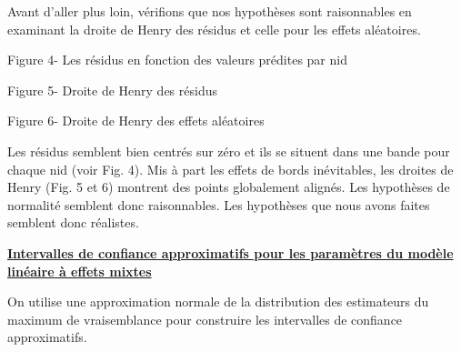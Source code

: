 \documentclass[11pt,fleqn]{book} %
\begin{document}
	\vspace{2em}
	
	Avant d'aller plus loin, vérifions que nos hypothèses sont raisonnables en examinant la droite de Henry des résidus et celle pour les effets aléatoires.
	
	
	\newpage
	
	\begin{center} Figure 4-  Les résidus en fonction des valeurs prédites par nid  \end{center}
	
	\vspace{2em}
	
	\begin{center} Figure 5- Droite de Henry des résidus    \end{center}
	
	\begin{center} Figure 6- Droite de Henry des effets aléatoires  \end{center}
	
	\vspace{2em}
	
	Les résidus semblent bien centrés sur zéro et ils se situent dans une bande pour chaque nid (voir Fig. 4).
	Mis à part les effets de bords inévitables, les droites de Henry (Fig. 5 et 6) montrent des points globalement alignés. Les hypothèses de normalité semblent donc raisonnables. Les hypothèses que nous avons faites semblent donc réalistes.
	
	\newpage
	
	\underline{\textbf{Intervalles de confiance approximatifs pour les paramètres du modèle linéaire à effets mixtes}}
	
	\vspace{0.5em}
	
	On utilise une approximation normale de la distribution des estimateurs du maximum de vraisemblance pour construire les intervalles de confiance approximatifs.
	
	\vspace{2em}
	
	
	\vspace{2em}
	
	
	
\end{document}
